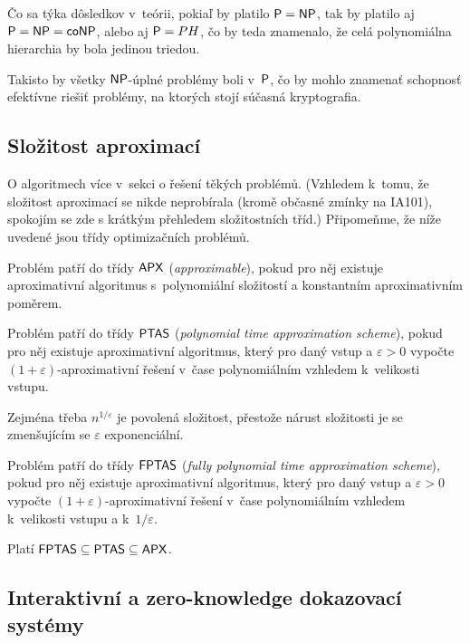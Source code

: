 Čo sa týka dôsledkov v~teórii, pokiaľ by platilo $\P = \NP$, tak by 
platilo aj $\P = \NP = \coNP$, alebo aj $\P = PH$, čo by teda znamenalo,
že celá polynomiálna hierarchia by bola jedinou triedou.

Takisto by všetky $\NP$-úplné problémy boli v~$\P$, čo by mohlo znamenať
schopnosť efektívne riešiť problémy, na ktorých stojí súčasná kryptografia.

\subsection{Složitost aproximací}

O algoritmech více v~sekci o řešení těkých problémů.
(Vzhledem k~tomu, že složitost aproximací se nikde neprobírala (kromě
občasné zmínky 
na IA101), spokojím se zde s krátkým přehledem složitostních tříd.)
Připomeňme, že níže uvedené jsou třídy optimizačních problémů.

\begin{definition}
    Problém patří do třídy $\APX$ ({\em approximable}), pokud pro něj existuje
    aproximativní algoritmus s~polynomiální složitostí
    a konstantním aproximativním poměrem.
\end{definition}

\begin{definition}
    Problém patří do třídy $\PTAS$ ({\em polynomial time approximation
    scheme}), pokud pro něj existuje
    aproximativní algoritmus, který pro daný vstup a $\varepsilon > 0$
    vypočte $(1+\varepsilon)$-aproximativní řešení
    v~čase polynomiálním vzhledem k~velikosti vstupu.
\end{definition}

Zejména třeba $n^{1/\varepsilon}$ je povolená
složitost, přestože nárust složitosti je se zmenšujícím se $\varepsilon$
exponenciální.

\begin{definition}
    Problém patří do třídy $\FPTAS$ ({\em fully polynomial time approximation
    scheme}), pokud pro něj existuje
    aproximativní algoritmus, který pro daný vstup a $\varepsilon > 0$
    vypočte $(1+\varepsilon)$-aproximativní řešení
    v~čase polynomiálním vzhledem k~velikosti vstupu a k~$1/\varepsilon$.
\end{definition}

Platí $\FPTAS \subseteq \PTAS \subseteq \APX$.

\subsection{Interaktivní a zero-knowledge dokazovací systémy}

